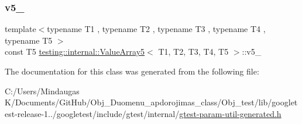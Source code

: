 \mbox{\label{classtesting_1_1internal_1_1_value_array5_a230e3732c5e6865943419df56cd6e210}} 
\subsubsection{\texorpdfstring{v5\_}{v5\_}}
{\footnotesize\ttfamily template$<$typename T1 , typename T2 , typename T3 , typename T4 , typename T5 $>$ \\
const T5 \mbox{\hyperlink{classtesting_1_1internal_1_1_value_array5}{testing\+::internal\+::\+Value\+Array5}}$<$ T1, T2, T3, T4, T5 $>$\+::v5\+\_\+\hspace{0.3cm}{\ttfamily [private]}}



The documentation for this class was generated from the following file\+:\begin{DoxyCompactItemize}
\item 
C\+:/\+Users/\+Mindaugas K/\+Documents/\+Git\+Hub/\+Obj\+\_\+\+Duomenu\+\_\+apdorojimas\+\_\+class/\+Obj\+\_\+test/lib/googletest-\/release-\/1../googletest/include/gtest/internal/\mbox{\hyperlink{gtest-param-util-generated_8h}{gtest-\/param-\/util-\/generated.\+h}}\end{DoxyCompactItemize}
